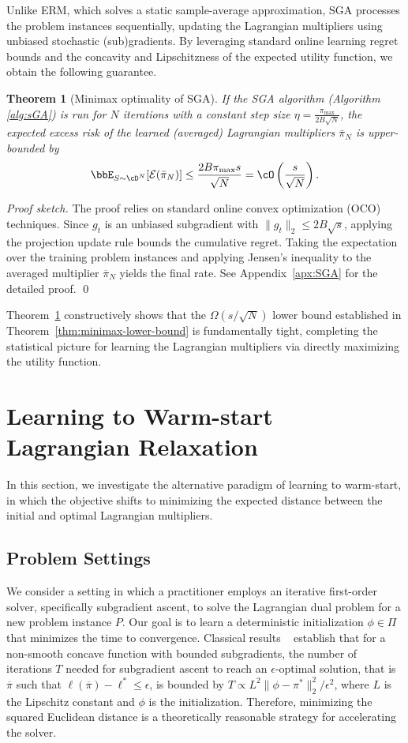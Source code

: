 \documentclass{article}
\theoremstyle{plain}
\newtheorem{theorem}{Theorem}[section]
\theoremstyle{definition}
\theoremstyle{remark}
\begin{document}
Unlike ERM, which solves a static sample-average approximation, SGA processes the problem instances sequentially, updating the Lagrangian multipliers using unbiased stochastic (sub)gradients. By leveraging standard online learning regret bounds and the concavity and Lipschitzness of the expected utility function, we obtain the following guarantee. 
\begin{theorem}[Minimax optimality of SGA] \label{thm:minimax-SGA}
    If the SGA algorithm (Algorithm \ref{alg:sGA}) is run for $N$ iterations with a constant step size $\eta = \frac{\pi_{\max}}{2B\sqrt{N}}$, the expected excess risk of the learned (averaged) Lagrangian multipliers $\bar{\pi}_N$ is upper-bounded by
    \[
        \bbE_{S \sim \cD^N}[\mathcal{E}(\bar{\pi}_N)] \leq \frac{2B\pi_{\max} s}{\sqrt{N}} = \cO\left(\frac{s}{\sqrt{N}}\right).
    \]
\end{theorem}
\textit{Proof sketch.}
    The proof relies on standard online convex optimization (OCO) techniques. Since $g_t$ is an unbiased subgradient with $\|g_t\|_2 \leq 2B\sqrt{s}$, applying the projection update rule bounds the cumulative regret. Taking the expectation over the training problem instances and applying Jensen's inequality to the averaged multiplier $\overline{\pi}_N$ yields the final rate. See Appendix~\ref{apx:SGA} for the detailed proof. 
\qed

Theorem~\ref{thm:minimax-SGA} constructively shows that the $\Omega(s/\sqrt{N})$ lower bound established in Theorem~\ref{thm:minimax-lower-bound} is fundamentally tight, completing the statistical picture for learning the Lagrangian multipliers via directly maximizing the utility function. 
    
\section{Learning to Warm-start Lagrangian Relaxation} \label{sec:warm-start-lagrangian-relaxation}
In this section, we investigate the alternative paradigm of learning to warm-start, in which the objective shifts to minimizing the expected distance between the initial and optimal Lagrangian multipliers. 

\subsection{Problem Settings} \label{sec:warm-start-problem-setting}
We consider a setting in which a practitioner employs an iterative first-order solver, specifically subgradient ascent, to solve the Lagrangian dual problem for a new problem instance $P$. Our goal is to learn a deterministic initialization $\phi \in \Pi$ that minimizes the time to convergence. Classical results ~\citep[Theorem~3.2.2]{nesterov2018lectures} establish that for a non-smooth concave function with bounded subgradients, the number of iterations $T$ needed for subgradient ascent to reach an $\epsilon$-optimal solution, {that is $\overline{\pi}$ such that $\ell(\overline{\pi}) - \ell^* \leq \epsilon$}, is bounded by $T \propto L^2\|\phi - \pi^*\|_2^2/\epsilon^2$, where $L$ is the Lipschitz constant and $\phi$ is the initialization. Therefore, minimizing the squared Euclidean distance is a theoretically reasonable strategy for accelerating the solver. 
\end{document}
